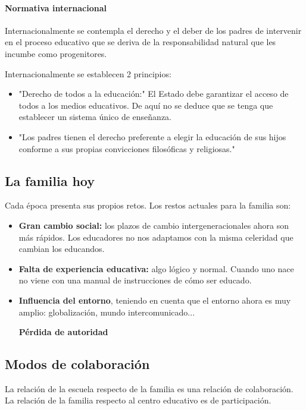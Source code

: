 \documentclass[palatino]{apuntesURJC}
\begin{document}
\paragraph{Normativa internacional}
Internacionalmente se contempla el derecho y el deber de los padres de intervenir en el proceso educativo que se deriva de la responsabilidad natural que les incumbe como progenitores.

Internacionalmente se establecen 2 principios:

\begin{itemize}
	\item "Derecho de todos a la educación:" El Estado debe garantizar el acceso de todos a los medios educativos. 
	De aquí no se deduce que se tenga que establecer un sistema único de enseñanza.
	\item "Los padres tienen el derecho preferente a elegir la educación de sus hijos conforme a sus propias convicciones filosóficas y religiosas."
\end{itemize}

\subsection{La familia hoy}

Cada época presenta sus propios retos. 
%
Los restos actuales para la familia son:

\begin{itemize}
	\item \textbf{Gran cambio social:} los plazos de cambio intergeneracionales ahora son más rápidos. 
	Los educadores no nos adaptamos con la misma celeridad que cambian los educandos.
	\item \textbf{Falta de experiencia educativa: } algo lógico y normal. 
	Cuando uno nace no viene con una manual de instrucciones de cómo ser educado.
	
	\item \textbf{Influencia del entorno}, teniendo en cuenta que el entorno ahora es muy amplio: globalización, mundo intercomunicado...
	
	\subitem \textbf{Pérdida de autoridad}
\end{itemize}

\subsection{Modos de colaboración}

La relación de la escuela respecto de la familia es una relación de colaboración.
%
La relación de la familia respecto al centro educativo es de participación.
\end{document}
